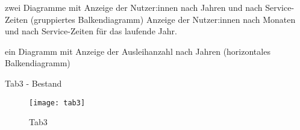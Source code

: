     zwei Diagramme mit
        Anzeige der Nutzer:innen nach Jahren und nach Service-Zeiten (gruppiertes Balkendiagramm)
        Anzeige der Nutzer:innen nach Monaten und nach Service-Zeiten für das laufende Jahr.
        
     ein Diagramm mit
        Anzeige der Ausleihanzahl nach Jahren (horizontales Balkendiagramm)
    
    Tab3 - Bestand
    
    \begin{figure}[H]
        \centering
            \texttt{[image: tab3]}
            \caption{Tab3}
            \label{fig:tab3}
    \end{figure}

    \begingroup
    \setlength{\tabcolsep}{12pt} %
    \renewcommand{\arraystretch}{1.5} 
